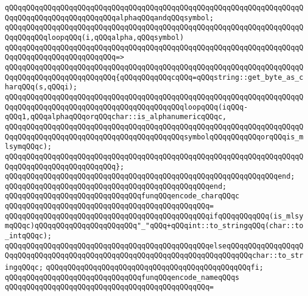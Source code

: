 \verb|qQQqqQQqqQQqqQQqqQQqqQQqqQQqqQQqqQQqqQQqqQQqqQQqqQQqqQQqqQQqqQQqqQQqqQQqqQQqqQQqqQQqqQQqqQQqqQQqalphaqQQqandqQQqsymbol;|\newline
\newline
\verb|qQQqqQQqqQQqqQQqqQQqqQQqqQQqqQQqqQQqqQQqqQQqqQQqqQQqqQQqqQQqqQQqqQQqqQQqqQQqqQQqloopqQQq(i,qQQqalpha,qQQqsymbol)|\newline
\verb|qQQqqQQqqQQqqQQqqQQqqQQqqQQqqQQqqQQqqQQqqQQqqQQqqQQqqQQqqQQqqQQqqQQqqQQqqQQqqQQqqQQqqQQqqQQqqQQq=>|\newline
\verb|qQQqqQQqqQQqqQQqqQQqqQQqqQQqqQQqqQQqqQQqqQQqqQQqqQQqqQQqqQQqqQQqqQQqqQQqqQQqqQQqqQQqqQQqqQQqqQQq{qQQqqQQqqQQqcqQQq=qQQqstring::get_byte_as_charqQQq(s,qQQqi);|\newline
\verb|qQQqqQQqqQQqqQQqqQQqqQQqqQQqqQQqqQQqqQQqqQQqqQQqqQQqqQQqqQQqqQQqqQQqqQQqqQQqqQQqqQQqqQQqqQQqqQQqqQQqqQQqqQQqqQQqloopqQQq(iqQQq-qQQq1,qQQqalphaqQQqorqQQqchar::is_alphanumericqQQqc,|\newline
\verb|qQQqqQQqqQQqqQQqqQQqqQQqqQQqqQQqqQQqqQQqqQQqqQQqqQQqqQQqqQQqqQQqqQQqqQQqqQQqqQQqqQQqqQQqqQQqqQQqqQQqqQQqqQQqqQQqsymbolqQQqqQQqqQQqorqQQqis_mlsymqQQqc);|\newline
\verb|qQQqqQQqqQQqqQQqqQQqqQQqqQQqqQQqqQQqqQQqqQQqqQQqqQQqqQQqqQQqqQQqqQQqqQQqqQQqqQQqqQQqqQQqqQQqqQQq};|\newline
\verb|qQQqqQQqqQQqqQQqqQQqqQQqqQQqqQQqqQQqqQQqqQQqqQQqqQQqqQQqqQQqqQQqend;|\newline
\verb|qQQqqQQqqQQqqQQqqQQqqQQqqQQqqQQqqQQqqQQqqQQqqQQqend;|\newline
\newline
\verb|qQQqqQQqqQQqqQQqqQQqqQQqqQQqqQQqfunqQQqencode_charqQQqc|\newline
\verb|qQQqqQQqqQQqqQQqqQQqqQQqqQQqqQQqqQQqqQQqqQQqqQQq=|\newline
\verb|qQQqqQQqqQQqqQQqqQQqqQQqqQQqqQQqqQQqqQQqqQQqqQQqifqQQqqQQqqQQq(is_mlsymqQQqc)qQQqqQQqqQQqqQQqqQQqqQQq"_"qQQq+qQQqint::to_stringqQQq(char::to_intqQQqc);|\newline
\verb|qQQqqQQqqQQqqQQqqQQqqQQqqQQqqQQqqQQqqQQqqQQqqQQqelseqQQqqQQqqQQqqQQqqQQqqQQqqQQqqQQqqQQqqQQqqQQqqQQqqQQqqQQqqQQqqQQqqQQqqQQqqQQqchar::to_stringqQQqc;|\newline
\verb|qQQqqQQqqQQqqQQqqQQqqQQqqQQqqQQqqQQqqQQqqQQqqQQqfi;|\newline
\newline
\verb|qQQqqQQqqQQqqQQqqQQqqQQqqQQqqQQqfunqQQqencode_nameqQQqs|\newline
\verb|qQQqqQQqqQQqqQQqqQQqqQQqqQQqqQQqqQQqqQQqqQQqqQQq=|\newline
